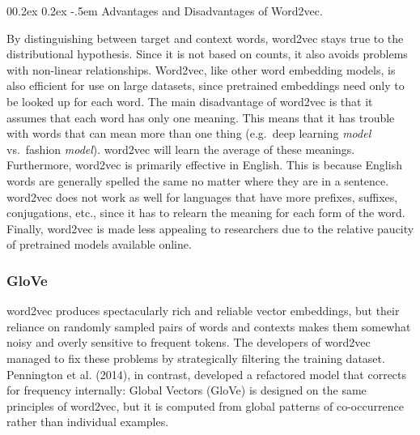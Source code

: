 \documentclass[
  man,
  floatsintext,
  longtable,
  nolmodern,
  notxfonts,
  notimes,
  colorlinks=true,linkcolor=blue,citecolor=blue,urlcolor=blue]{apa7}
\makeatletter
\renewcommand{\paragraph}{\@startsection{paragraph}{4}{\parindent}%
	{0\baselineskip \@plus 0.2ex \@minus 0.2ex}%
	{-.5em}%
	{\normalfont\normalsize\bfseries\typesectitle}}
\makeatother
\begin{document}
\paragraph{Advantages and Disadvantages of
Word2vec.}\label{advantages-and-disadvantages-of-word2vec}

By distinguishing between target and context words, word2vec stays true
to the distributional hypothesis. Since it is not based on counts, it
also avoids problems with non-linear relationships. Word2vec, like other
word embedding models, is also efficient for use on large datasets,
since pretrained embeddings need only to be looked up for each word. The
main disadvantage of word2vec is that it assumes that each word has only
one meaning. This means that it has trouble with words that can mean
more than one thing (e.g.~deep learning \emph{model} vs.~fashion
\emph{model}). word2vec will learn the average of these meanings.
Furthermore, word2vec is primarily effective in English. This is because
English words are generally spelled the same no matter where they are in
a sentence. word2vec does not work as well for languages that have more
prefixes, suffixes, conjugations, etc., since it has to relearn the
meaning for each form of the word. Finally, word2vec is made less
appealing to researchers due to the relative paucity of pretrained
models available online.

\subsubsection{GloVe}\label{glove}

word2vec produces spectacularly rich and reliable vector embeddings, but
their reliance on randomly sampled pairs of words and contexts makes
them somewhat noisy and overly sensitive to frequent tokens. The
developers of word2vec managed to fix these problems by strategically
filtering the training dataset. Pennington et al. (2014), in contrast,
developed a refactored model that corrects for frequency internally:
Global Vectors (GloVe) is designed on the same principles of word2vec,
but it is computed from global patterns of co-occurrence rather than
individual examples.
\end{document}
